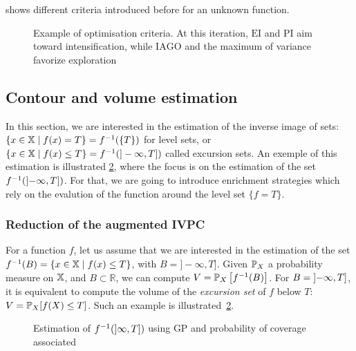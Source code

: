 \documentclass[../../Main_ManuscritThese.tex]{subfiles}
\newcommand\imgpath{/home/victor/acadwriting/Manuscrit/Text/Chapter4/img/}
\begin{document}
 shows different criteria
introduced before for an unknown function.
\begin{figure}[ht!]
  \centering
  
  \caption[Optimisation criteria for GP]{\label{fig:example_optimisation_criteria} Example of optimisation criteria. At this iteration, $\mathrm{EI}$ and $\mathrm{PI}$ aim toward intensification, while $\mathrm{IAGO}$ and the maximum of variance favorize exploration}
\end{figure}

%
\subsection{Contour and volume estimation}
\label{sec:GP_vol_estim}
In this section, we are interested in the estimation of the inverse
image of sets: $\{x \in \mathbb{X} \mid f(x) = T\}=f^{-1}(\{T\})$ for
level sets, or
$\{x\in\mathbb{X} \mid f(x) \leq T\} = f^{-1}(]-\infty, T])$ called
excursion sets. An exemple of this estimation is illustrated
\cref{fig:prob_coverage_example}, where the focus is on the estimation
of the set $f^{-1}(\interval[open left]{-\infty}{T})$. For that, we
are going to introduce enrichment strategies which rely on the
evalution of the function around the level set $\{f=T\}$.

\subsubsection{Reduction of the augmented IVPC}
For a function $f$, let us assume that we are interested in the
estimation of the set
$f^{-1}(B) = \{x \in \mathbb{X} \mid f(x) \leq T\}$, with
$B = ]-\infty, T]$. Given $\mathbb{P}_{X}$ a probability
measure on $\mathbb{X}$, and $B\subset \mathbb{R}$, we can compute
$V=\mathbb{P}_{X}\left[f^{-1}(B)\right]$. For
$B = \interval[open left]{-\infty}{T}$, it is equivalent to compute the
volume of the \emph{excursion set} of $f$ below $T$:
$V=\mathbb{P}_{X}[f(X) \leq T]$. Such an example is illustrated~\cref{fig:prob_coverage_example}.%
\begin{figure}[ht]
  \centering
  
  \caption[Estimation of $f^{-1}(B)$ using GP]{\label{fig:prob_coverage_example} Estimation of $f^{-1}(\interval[open left]{\infty}{T})$ using GP and probability of coverage associated %
  }
\end{figure}
\end{document}
